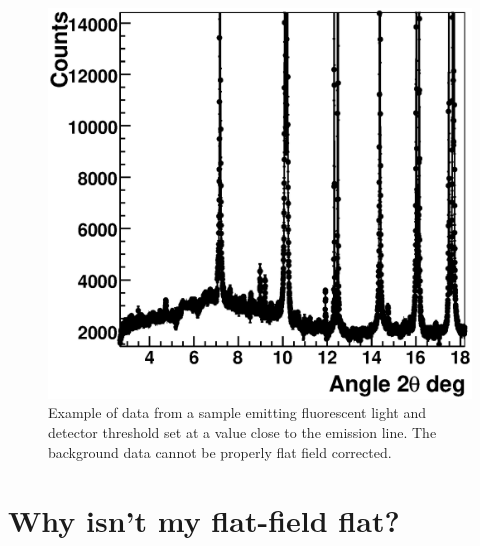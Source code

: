 \begin{figure}
\begin{center}
\includegraphics[width=\textwidth]{images/sample_with_fluorescence}
\end{center}
\caption{Example of data from a sample emitting fluorescent light and detector threshold set at a value close to the emission line. The background data cannot be properly flat field corrected.}\label{fig:samplefluo}
\end{figure}


\section{Why isn't my flat-field flat?}

